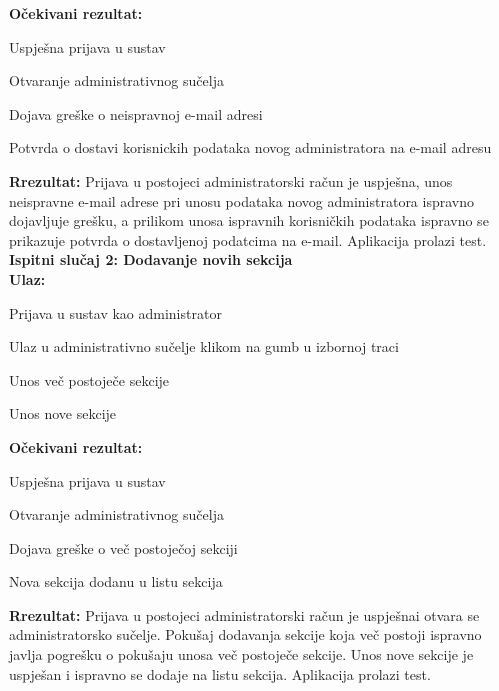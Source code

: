 			 \textbf{Očekivani rezultat:}
			 \begin{packed_item}
			 	\item {Uspješna prijava u sustav}
			 	\item {Otvaranje administrativnog sučelja}
			 	\item {Dojava greške o neispravnoj e-mail adresi}
			 	\item {Potvrda o dostavi korisnickih podataka novog administratora na e-mail adresu}
			 \end{packed_item}
			 \textbf{Rrezultat: }Prijava u postojeci administratorski račun je uspješna, unos neispravne e-mail adrese pri unosu podataka novog administratora ispravno dojavljuje grešku, a prilikom unosa ispravnih korisničkih podataka ispravno se prikazuje potvrda o dostavljenoj podatcima na e-mail. Aplikacija prolazi test.\\
			
			 \textbf{Ispitni slučaj 2: Dodavanje novih sekcija}\\
			 \textbf{Ulaz:}
			 \begin{packed_item}
			 	\item {Prijava u sustav kao administrator}
			 	\item {Ulaz u administrativno sučelje klikom na gumb u izbornoj traci}
			 	\item {Unos več postoječe sekcije}
			 	\item {Unos nove sekcije}
			 \end{packed_item}
			 \textbf{Očekivani rezultat:}
			 \begin{packed_item}
			 	\item {Uspješna prijava u sustav}
			 	\item {Otvaranje administrativnog sučelja}
			 	\item {Dojava greške o več postoječoj sekciji}
			 	\item {Nova sekcija dodanu u listu sekcija}
			 \end{packed_item}
			 \textbf{Rrezultat: }Prijava u postojeci administratorski račun je uspješnai otvara se administratorsko sučelje. Pokušaj dodavanja sekcije koja več postoji ispravno javlja pogrešku o pokušaju unosa več postoječe sekcije. Unos nove sekcije je uspješan i ispravno se dodaje na listu sekcija. Aplikacija prolazi test.\\
			
